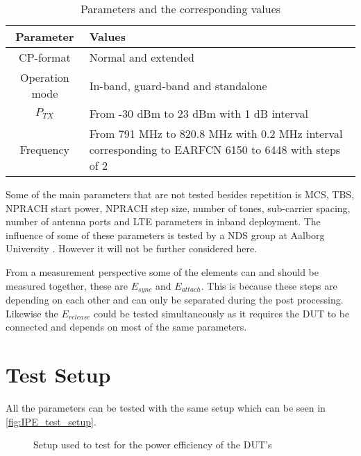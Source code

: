 \begin{table}[H]
\centering
\begin{tabular}{|c|p{8cm}|} \hline
\textbf{Parameter} & \textbf{Values} \\ \hline
CP-format & Normal and extended \\ \hline
Operation mode & In-band, guard-band and standalone \\ \hline
$P_{TX}$ & From -30 dBm to 23 dBm with 1 dB interval \\ \hline
Frequency & From 791 MHz to 820.8 MHz with 0.2 MHz interval corresponding to EARFCN 6150 to 6448 with steps of 2 \\ \hline
\end{tabular}
\caption{Parameters and the corresponding values}
\label{tab:par_val}
\end{table}

Some of the main parameters that are not tested besides repetition is \gls{MCS}, \gls{TBS}, NPRACH start power, NPRACH step size, number of tones, sub-carrier spacing, number of antenna ports and LTE parameters in inband deployment. The influence of some of these parameters is tested by a NDS group at Aalborg University . However it will not be further considered here.

From a measurement perspective some of the elements can and should be measured together, these are $E_{sync}$ and $E_{attach}$. This is because these steps are depending on each other and can only be separated during the  post processing. Likewise the $E_{release}$ could be tested simultaneously as it requires the DUT to be connected and depends on most of the same parameters.  



\section{Test Setup}
All the parameters can be tested with the same setup which can be seen in \autoref{fig:IPE_test_setup}.

\begin{figure}[H]
\centering

\caption{Setup used to test for the power efficiency of the \gls{DUT}'s}
\label{fig:IPE_test_setup}
\end{figure}


